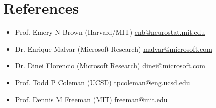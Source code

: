 \section*{References}

\begin{itemize}

    \item Prof. Emery N Brown (Harvard/MIT) \href{mailto:enb@neurostat.mit.edu}{enb@neurostat.mit.edu}

    \item Dr. Enrique Malvar (Microsoft Research) \href{mailto:malvar@microsoft.com}{malvar@microsoft.com}

    \item Dr. Dinei Florencio (Microsoft Research) \href{mailto:dinei@microsoft.com}{dinei@microsoft.com}

    \item Prof. Todd P Coleman (UCSD) \href{mailto:tpcoleman@eng.ucsd.edu}{tpcoleman@eng.ucsd.edu}

    \item Prof. Dennis M Freeman (MIT)  \href{mailto:freeman@mit.edu}{freeman@mit.edu}
  \end{itemize}
